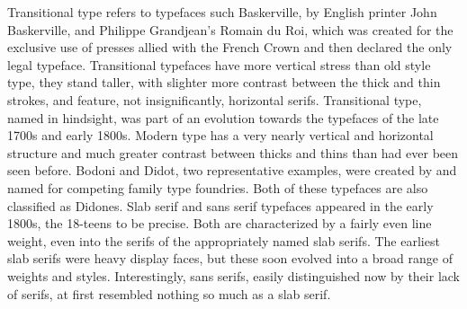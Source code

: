 \documentclass[12pt,a4paper,twocolumn]{book} %
\begin{document}
Transitional type refers to typefaces such Baskerville, by English printer John Baskerville, and Philippe Grandjean’s Romain du Roi, which was created for the exclusive use of presses allied with the French Crown and then declared the only legal typeface. 
Transitional typefaces have more vertical stress than old style type, they stand taller, with slighter more contrast between the thick and thin strokes, and feature, not insignificantly, horizontal serifs. Transitional type, named in hindsight, was part of an evolution towards the typefaces of the late 1700s and early 1800s.
Modern type has a very nearly vertical and horizontal structure and much greater contrast between thicks and thins than had ever been seen before. Bodoni and Didot, two representative examples, were created by and named for competing family type foundries. Both of these typefaces are also classified as Didones.
Slab serif and sans serif typefaces appeared in the early 1800s, the 18-teens to be precise. Both are characterized by a fairly even line weight, even into the serifs of the appropriately named slab serifs. The earliest slab serifs were heavy display faces, but these soon evolved into a broad range of weights and styles. Interestingly, sans serifs, easily distinguished now by their lack of serifs, at first resembled nothing so much as a slab serif.
\end{document}
